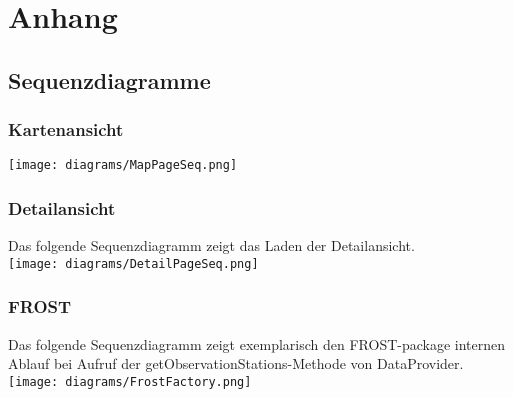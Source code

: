 \section{Anhang}
\subsection{Sequenzdiagramme}
\subsubsection*{Kartenansicht}


\texttt{[image: diagrams/MapPageSeq.png]}

\newpage
\subsubsection*{Detailansicht}
Das folgende Sequenzdiagramm zeigt das Laden der \gls{Detailansicht}.\\


\texttt{[image: diagrams/DetailPageSeq.png]}

\newpage
\subsubsection*{FROST}
Das folgende Sequenzdiagramm zeigt exemplarisch den FROST-package internen Ablauf bei Aufruf der getObservationStations-Methode von DataProvider.\\


\texttt{[image: diagrams/FrostFactory.png]}